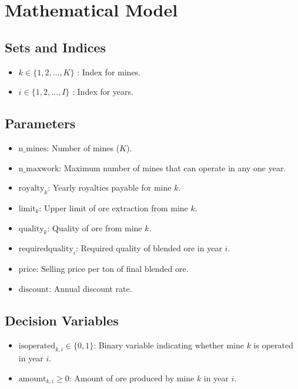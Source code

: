 \documentclass{article}
\begin{document}
\section*{Mathematical Model}

\subsection*{Sets and Indices}
\begin{itemize}
    \item \( k \in \{1, 2, \ldots, K\} \) : Index for mines.
    \item \( i \in \{1, 2, \ldots, I\} \) : Index for years.
\end{itemize}

\subsection*{Parameters}
\begin{itemize}
    \item \( \text{n\_mines} \): Number of mines (\(K\)).
    \item \( \text{n\_maxwork} \): Maximum number of mines that can operate in any one year.
    \item \( \text{royalty}_k \): Yearly royalties payable for mine \( k \).
    \item \( \text{limit}_k \): Upper limit of ore extraction from mine \( k \).
    \item \( \text{quality}_k \): Quality of ore from mine \( k \).
    \item \( \text{requiredquality}_i \): Required quality of blended ore in year \( i \).
    \item \( \text{price} \): Selling price per ton of final blended ore.
    \item \( \text{discount} \): Annual discount rate.
\end{itemize}

\subsection*{Decision Variables}
\begin{itemize}
    \item \( \text{isoperated}_{k,i} \in \{0, 1\} \): Binary variable indicating whether mine \( k \) is operated in year \( i \).
    \item \( \text{amount}_{k,i} \geq 0 \): Amount of ore produced by mine \( k \) in year \( i \).
\end{itemize}
\end{document}

